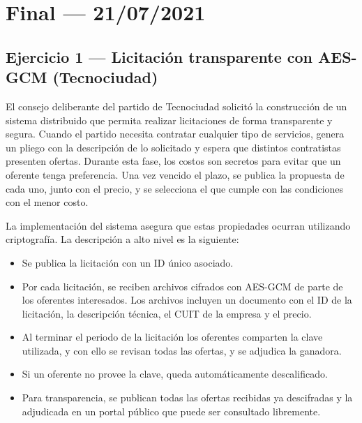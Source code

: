 \section{Final --- 21/07/2021}

\subsection{Ejercicio 1 --- Licitación transparente con AES-GCM (Tecnociudad)}

\begin{consigna}
El consejo deliberante del partido de Tecnociudad solicitó la construcción de un sistema
distribuido que permita realizar licitaciones de forma transparente y segura. Cuando el
partido necesita contratar cualquier tipo de servicios, genera un pliego con la descripción
de lo solicitado y espera que distintos contratistas presenten ofertas. Durante esta fase,
los costos son secretos para evitar que un oferente tenga preferencia. Una vez vencido el
plazo, se publica la propuesta de cada uno, junto con el precio, y se selecciona el que
cumple con las condiciones con el menor costo.

La implementación del sistema asegura que estas propiedades ocurran utilizando criptografía.
La descripción a alto nivel es la siguiente:
\begin{itemize}
  \item Se publica la licitación con un ID único asociado.
  \item Por cada licitación, se reciben archivos cifrados con AES-GCM de parte de los
  oferentes interesados. Los archivos incluyen un documento con el ID de la licitación, la
  descripción técnica, el CUIT de la empresa y el precio.
  \item Al terminar el periodo de la licitación los oferentes comparten la clave utilizada,
  y con ello se revisan todas las ofertas, y se adjudica la ganadora.
  \item Si un oferente no provee la clave, queda automáticamente descalificado.
  \item Para transparencia, se publican todas las ofertas recibidas ya descifradas y la
  adjudicada en un portal público que puede ser consultado libremente.
\end{itemize}


\end{consigna}
